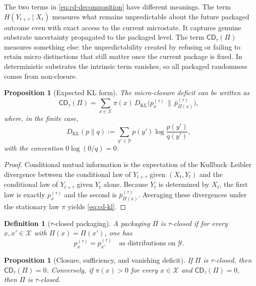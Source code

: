 \documentclass[11pt]{article}
\newtheorem{proposition}[theorem]{Proposition}
\newtheorem{definition}[theorem]{Definition}
\numberwithin{equation}{section}
\begin{document}
The two terms in \eqref{eq:cd-decomposition} have different meanings. The term $H(Y_{t+\tau}\mid X_t)$ measures what remains unpredictable about the future packaged outcome even with exact access to the current microstate. It captures genuine substrate uncertainty propagated to the packaged level. The term $\mathsf{CD}_\tau(\Pi)$ measures something else: the unpredictability created by refusing or failing to retain micro distinctions that still matter once the current package is fixed. In deterministic substrates the intrinsic term vanishes, so all packaged randomness comes from non-closure.

\begin{proposition}[Expected KL form]\label{prop:cd-kl}
The micro-closure deficit can be written as
\begin{equation}
\mathsf{CD}_\tau(\Pi)
=
\sum_{x \in \mathcal{X}}
\pi(x)\,
D_{\mathrm{KL}}\!\bigl(
p_x^{(\tau)}
\,\|\,
\bar p_{\Pi(x)}^{(\tau)}
\bigr),
\label{eq:cd-kl}
\end{equation}
where, in the finite case,
\[
D_{\mathrm{KL}}(p\|q) := \sum_{y' \in \mathcal{Y}} p(y') \log \frac{p(y')}{q(y')},
\]
with the convention $0 \log (0/q)=0$.
\end{proposition}

\begin{proof}
Conditional mutual information is the expectation of the Kullback--Leibler divergence between the conditional law of $Y_{t+\tau}$ given $(X_t,Y_t)$ and the conditional law of $Y_{t+\tau}$ given $Y_t$ alone. Because $Y_t$ is determined by $X_t$, the first law is exactly $p_x^{(\tau)}$ and the second is $\bar p_{\Pi(x)}^{(\tau)}$. Averaging these divergences under the stationary law $\pi$ yields \eqref{eq:cd-kl}.
\end{proof}

\begin{definition}[$\tau$-closed packaging]\label{def:tau-closed}
A packaging $\Pi$ is \emph{$\tau$-closed} if for every $x,x' \in \mathcal{X}$ with $\Pi(x)=\Pi(x')$, one has
\begin{equation}
p_x^{(\tau)} = p_{x'}^{(\tau)}
\quad\text{as distributions on }\mathcal{Y}.
\label{eq:tau-closed}
\end{equation}
\end{definition}

\begin{proposition}[Closure, sufficiency, and vanishing deficit]\label{prop:cd-zero}
If $\Pi$ is $\tau$-closed, then $\mathsf{CD}_\tau(\Pi)=0$. Conversely, if $\pi(x)>0$ for every $x \in \mathcal{X}$ and $\mathsf{CD}_\tau(\Pi)=0$, then $\Pi$ is $\tau$-closed.
\end{proposition}
\end{document}
